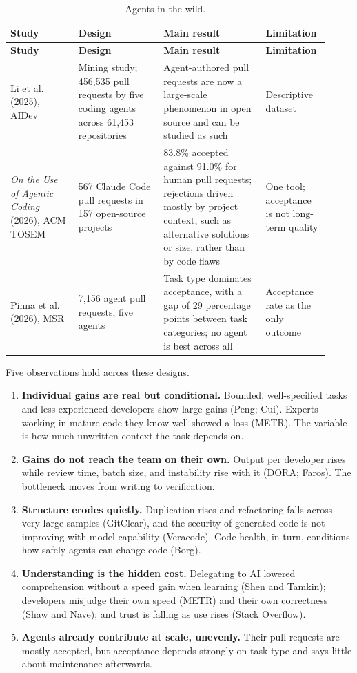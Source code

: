 \documentclass[11pt]{article}
\begin{document}
\small
\begin{longtable}{p{0.2\linewidth}p{0.25\linewidth}p{0.3\linewidth}p{0.17\linewidth}}
\caption{Agents in the wild.}\\
\toprule
\textbf{Study} & \textbf{Design} & \textbf{Main result} & \textbf{Limitation} \\
\midrule
\endfirsthead
\toprule
\textbf{Study} & \textbf{Design} & \textbf{Main result} & \textbf{Limitation} \\
\midrule
\endhead
\href{https://arxiv.org/pdf/2507.15003}{Li et al. (2025)}, AIDev & Mining study; 456,535 pull requests by five coding agents across 61,453 repositories & Agent-authored pull requests are now a large-scale phenomenon in open source and can be studied as such & Descriptive dataset \\
\href{https://dl.acm.org/doi/10.1145/3798166}{\emph{On the Use of Agentic Coding} (2026)}, ACM TOSEM & 567 Claude Code pull requests in 157 open-source projects & 83.8\% accepted against 91.0\% for human pull requests; rejections driven mostly by project context, such as alternative solutions or size, rather than by code flaws & One tool; acceptance is not long-term quality \\
\href{https://arxiv.org/abs/2602.08915}{Pinna et al. (2026)}, MSR & 7,156 agent pull requests, five agents & Task type dominates acceptance, with a gap of 29 percentage points between task categories; no agent is best across all & Acceptance rate as the only outcome \\
\bottomrule
\end{longtable}
\normalsize

Five observations hold across these designs.

\begin{enumerate}[leftmargin=*]
  \item \textbf{Individual gains are real but conditional.} Bounded, well-specified tasks and less experienced developers show large gains (Peng; Cui). Experts working in mature code they know well showed a loss (METR). The variable is how much unwritten context the task depends on.
  \item \textbf{Gains do not reach the team on their own.} Output per developer rises while review time, batch size, and instability rise with it (DORA; Faros). The bottleneck moves from writing to verification.
  \item \textbf{Structure erodes quietly.} Duplication rises and refactoring falls across very large samples (GitClear), and the security of generated code is not improving with model capability (Veracode). Code health, in turn, conditions how safely agents can change code (Borg).
  \item \textbf{Understanding is the hidden cost.} Delegating to AI lowered comprehension without a speed gain when learning (Shen and Tamkin); developers misjudge their own speed (METR) and their own correctness (Shaw and Nave); and trust is falling as use rises (Stack Overflow).
  \item \textbf{Agents already contribute at scale, unevenly.} Their pull requests are mostly accepted, but acceptance depends strongly on task type and says little about maintenance afterwards.
\end{enumerate}
\end{document}
